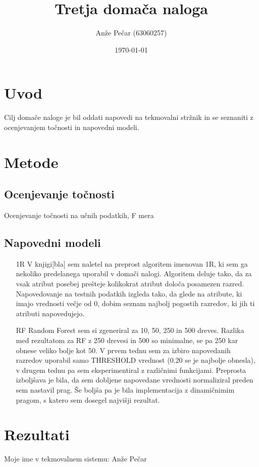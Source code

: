\documentclass[a4paper,11pt]{article}
\title{Tretja domača naloga}
\author{Anže Pečar (63060257)}
\date{\today}
\begin{document}
\maketitle

\section{Uvod}

Cilj domače naloge je bil oddati napovedi na tekmovalni stržnik in se seznaniti z ocenjevanjem točnosti in napovedni modeli.

\section{Metode}
\subsection{Ocenjevanje točnosti}
Ocenjevanje točnosti na učnih podatkih, F mera
\subsection{Napovedni modeli}
\begin{itemize}
\item[1R] V knjigi[bla] sem naletel na preprost algoritem imenovan 1R, ki sem ga nekoliko predelanega uporabil v domači nalogi. Algoritem deluje tako, da za vsak atribut posebej prešteje kolikokrat atribut določa posamezen razred. Napovedovanje na testnih podatkih izgleda tako, da glede na atribute, ki imajo vrednosti večje od 0, dobim seznam najbolj pogostih razredov, ki jih ti atributi napovedujejo. 
\item[RF] Random Forest sem si zgeneriral za 10, 50, 250 in 500 dreves. Razlika med rezultatom za RF z 250 drevesi in 500 so minimalne, se pa 250 kar obnese veliko bolje kot 50. V prvem tednu sem za izbiro napovedanih razredov uporabil samo THRESHOLD vrednost (0.20 se je najbolje obnesla), v drugem tednu pa sem eksperimentiral z različnimi funkcijami. Preprosta izboljšava je bila, da sem dobljene napovedane vrednosti normaliziral preden sem nastavil prag. Še boljša pa je bila implementacija z dinamičnimim pragom, s katero sem dosegel najvišji rezultat.
\end{itemize}
\section{Rezultati}
Moje ime v tekmovalnem sistemu: Anže Pečar
\end{document}
